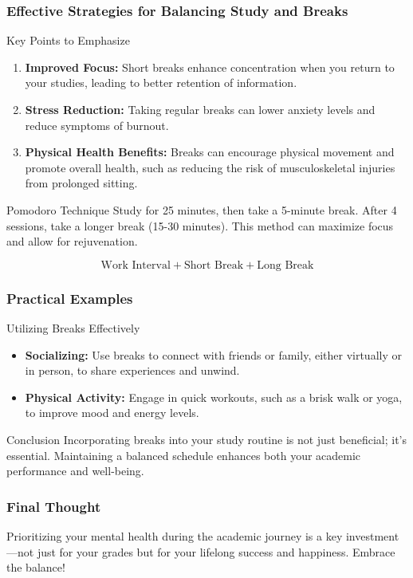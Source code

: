 \documentclass[aspectratio=169]{beamer}
\begin{document}
\begin{frame}[fragile]
    \frametitle{Effective Strategies for Balancing Study and Breaks}
    \begin{block}{Key Points to Emphasize}
        \begin{enumerate}
            \item \textbf{Improved Focus:} Short breaks enhance concentration when you return to your studies, leading to better retention of information.
            \item \textbf{Stress Reduction:} Taking regular breaks can lower anxiety levels and reduce symptoms of burnout.
            \item \textbf{Physical Health Benefits:} Breaks can encourage physical movement and promote overall health, such as reducing the risk of musculoskeletal injuries from prolonged sitting.
        \end{enumerate}
    \end{block}

    \begin{block}{Pomodoro Technique}
        Study for 25 minutes, then take a 5-minute break. After 4 sessions, take a longer break (15-30 minutes). This method can maximize focus and allow for rejuvenation.
        
        \begin{equation}
        \text{Work Interval} + \text{Short Break} + \text{Long Break}
        \end{equation}
    \end{block}
\end{frame}

\begin{frame}[fragile]
    \frametitle{Practical Examples}
    \begin{block}{Utilizing Breaks Effectively}
        \begin{itemize}
            \item \textbf{Socializing:} Use breaks to connect with friends or family, either virtually or in person, to share experiences and unwind.
            \item \textbf{Physical Activity:} Engage in quick workouts, such as a brisk walk or yoga, to improve mood and energy levels.
        \end{itemize}
    \end{block}

    \begin{block}{Conclusion}
        Incorporating breaks into your study routine is not just beneficial; it's essential. Maintaining a balanced schedule enhances both your academic performance and well-being.
    \end{block}
\end{frame}

\begin{frame}[fragile]
    \frametitle{Final Thought}
    Prioritizing your mental health during the academic journey is a key investment—not just for your grades but for your lifelong success and happiness. Embrace the balance!
\end{frame}
\end{document}

